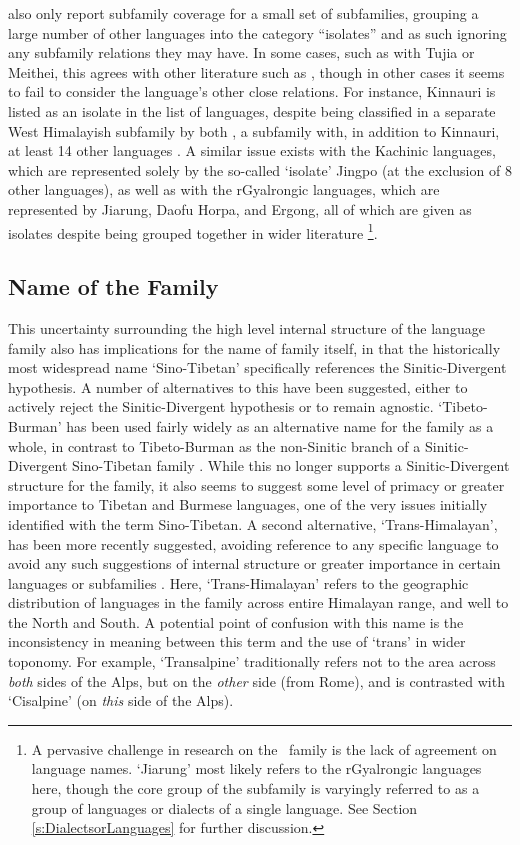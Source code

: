  also only report subfamily coverage for a small set of subfamilies, grouping a large number of other languages into the category ``isolates'' and as such ignoring any subfamily relations they may have. In some cases, such as with Tujia or Meithei, this agrees with other literature such as , though in other cases it seems to fail to consider the language's other close relations. For instance, Kinnauri is listed as an isolate in the list of languages, despite being classified in a separate West Himalayish subfamily by both , a subfamily with, in addition to Kinnauri, at least 14 other languages \cite{glottolog}. A similar issue exists with the Kachinic languages, which are represented solely by the so-called `isolate' Jingpo (at the exclusion of 8 other languages), as well as with the rGyalrongic languages, which are represented by Jiarung, Daofu Horpa, and Ergong, all of which are given as isolates despite being grouped together in wider literature \cites{Honkasalo2019}{Gates2021}\footnote{A pervasive challenge in research on the \lfam\ family is the lack of agreement on language names. `Jiarung' most likely refers to the rGyalrongic languages here, though the core group of the subfamily is varyingly referred to as a group of languages or dialects of a single language. See Section \ref{s:DialectsorLanguages} for further discussion.}.

\subsection{Name of the Family}

This uncertainty surrounding the high level internal structure of the language family also has implications for the name of family itself, in that the historically most widespread name `Sino-Tibetan' specifically references the Sinitic-Divergent hypothesis. A number of alternatives to this have been suggested, either to actively reject the Sinitic-Divergent hypothesis or to remain agnostic. `Tibeto-Burman' has been used fairly widely as an alternative name for the family as a whole, in contrast to Tibeto-Burman as the non-Sinitic branch of a Sinitic-Divergent Sino-Tibetan family \cite{VanDriem2007}. While this no longer supports a Sinitic-Divergent structure for the family, it also seems to suggest some level of primacy or greater importance to Tibetan and Burmese languages, one of the very issues initially identified with the term Sino-Tibetan. A second alternative, `Trans-Himalayan', has been more recently suggested, avoiding reference to any specific language to avoid any such suggestions of internal structure or greater importance in certain languages or subfamilies \cite{BlenchPost2014}. Here, `Trans-Himalayan' refers to the geographic distribution of languages in the family across entire Himalayan range, and well to the North and South. A potential point of confusion with this name is the inconsistency in meaning between this term and the use of `trans' in wider toponomy. For example, `Transalpine' traditionally refers not to the area across \textit{both} sides of the Alps, but on the \textit{other} side (from Rome), and is contrasted with `Cisalpine' (on \textit{this} side of the Alps).

